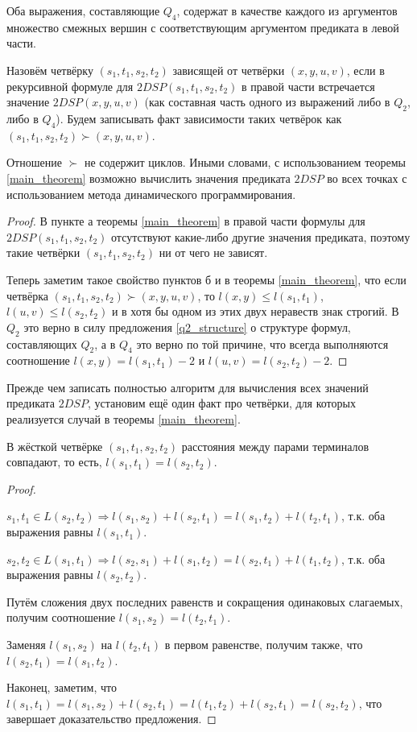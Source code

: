 \begin{proposition}
Оба выражения, составляющие $Q_4$, содержат в качестве каждого из аргументов множество смежных вершин с соответствующим аргументом предиката в левой части. 
\end{proposition}

Назовём четвёрку $(s_1, t_1, s_2, t_2)$ зависящей от четвёрки $(x, y, u, v)$, если в рекурсивной формуле для $2DSP(s_1, t_1, s_2, t_2)$ в правой части встречается значение $2DSP(x, y, u, v)$ (как составная часть одного из выражений либо в $Q_2$, либо в $Q_4$). Будем записывать факт зависимости таких четвёрок как $(s_1, t_1, s_2, t_2) \succ (x, y, u, v)$.

\begin{proposition}
Отношение $\succ$ не содержит циклов. Иными словами, с использованием теоремы \ref{main_theorem} возможно вычислить значения предиката $2DSP$ во всех точках с использованием метода динамического программирования.
\end{proposition}
\begin{proof}
В пункте а теоремы \ref{main_theorem} в правой части формулы для $2DSP(s_1, t_1, s_2, t_2)$ отсутствуют какие-либо другие значения предиката, поэтому такие четвёрки $(s_1, t_1, s_2, t_2)$ ни от чего не зависят.

Теперь заметим такое свойство пунктов б и в теоремы \ref{main_theorem}, что если четвёрка $(s_1, t_1, s_2, t_2) \succ (x, y, u, v)$, то $l(x, y) \leq l(s_1, t_1)$, $l(u, v) \leq l(s_2, t_2)$ и в хотя бы одном из этих двух неравеств знак строгий. В $Q_2$ это верно в силу предложения \ref{q2_structure} о структуре формул, составляющих $Q_2$, а в $Q_4$ это верно по той причине, что всегда выполняются соотношение $l(x, y) = l(s_1, t_1) - 2$ и $l(u, v) = l(s_2, t_2) - 2$.
\end{proof}

Прежде чем записать полностью алгоритм для вычисления всех значений предиката $2DSP$, установим ещё один факт про четвёрки, для которых реализуется случай в теоремы \ref{main_theorem}.

\begin{proposition}
В жёсткой четвёрке $(s_1, t_1, s_2, t_2)$ расстояния между парами терминалов совпадают, то есть, $l(s_1, t_1) = l(s_2, t_2)$.
\end{proposition}
\begin{proof} ~

$s_1, t_1 \in L(s_2, t_2) \Rightarrow l(s_1, s_2) + l(s_2, t_1) = l(s_1, t_2) + l(t_2, t_1)$, т.к. оба выражения равны $l(s_1, t_1)$.

$s_2, t_2 \in L(s_1, t_1) \Rightarrow l(s_2, s_1) + l(s_1, t_2) = l(s_2, t_1) + l(t_1, t_2)$, т.к. оба выражения равны $l(s_2, t_2)$.

Путём сложения двух последних равенств и сокращения одинаковых слагаемых, получим соотношение $l(s_1, s_2) = l(t_2, t_1)$. 

Заменяя $l(s_1, s_2)$ на $l(t_2, t_1)$ в первом равенстве, получим также, что $l(s_2, t_1) = l(s_1, t_2)$.

Наконец, заметим, что $l(s_1, t_1) = l(s_1, s_2) + l(s_2, t_1) = l(t_1, t_2) + l(s_2, t_1) = l(s_2, t_2)$, что завершает доказательство предложения.
\end{proof}

